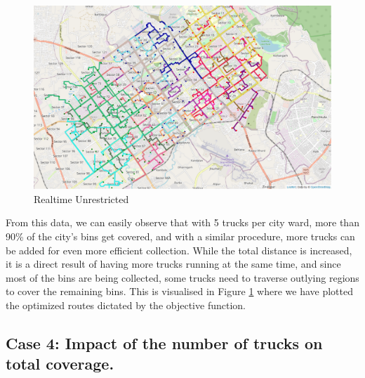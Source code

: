 \documentclass[12pt]{article}
\begin{document}
\begin{figure}[H]
    \centering
    \includegraphics[scale=0.4]{Dynamic5trucks.png}
    \caption{Realtime Unrestricted}\label{fig2}
\end{figure}

From this data, we can easily observe that with 5 trucks per city ward, more than 90\% of the city's bins get covered, and with a similar procedure, more trucks can be added for even more efficient collection. While the total distance is increased, it is a direct result of having more trucks running at the same time, and since most of the bins are being collected, some trucks need to traverse outlying regions to cover the remaining bins. This is visualised in Figure \ref{fig2} where we have plotted the optimized routes dictated by the objective function.

\subsection*{Case 4: Impact of the number of trucks on total coverage.}
\end{document}
